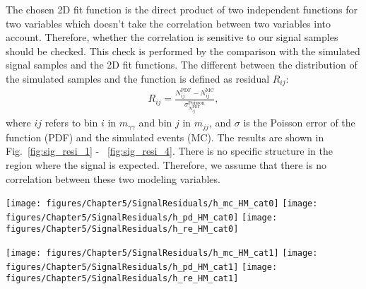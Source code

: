 The chosen 2D fit function is the direct product of two independent functions for two variables which doesn't take the correlation between two variables into account.
Therefore, whether the correlation is sensitive to our signal samples should be checked.
This check is performed by the comparison with the simulated signal samples and the 2D fit functions.
The different between the distribution of the simulated samples and the function is defined as residual $R_{ij}$:
\begin{equation} \label{eq:SigCorResidues}
  \begin{aligned}
	R_{ij} = \frac{N^{\textrm{PDF}}_{ij} - N^{\textrm{MC}}_{ij}}{\sigma_{N^{\textrm{PDF}}_{ij}}^{\textrm{Poisson}}},
  \end{aligned}
\end{equation}
where $ij$ refers to bin $i$ in $m_{\gamma\gamma}$ and bin $j$ in $m_{jj}$, and $\sigma$ is the Poisson error of the function (PDF) and the simulated events (MC).
The results are shown in Fig.~\ref{fig:sig_resi_1} - ~\ref{fig:sig_resi_4}.
There is no specific structure in the region where the signal is expected.
Therefore, we assume that there is no correlation between these two modeling variables.

\begin{figure*}[h]
  \centering
\texttt{[image: figures/Chapter5/SignalResiduals/h\_mc\_HM\_cat0]}\hfil
\texttt{[image: figures/Chapter5/SignalResiduals/h\_pd\_HM\_cat0]}\hfil
\texttt{[image: figures/Chapter5/SignalResiduals/h\_re\_HM\_cat0]}\hfil
  \caption{2D distributions of the signal MC (left), fitted PDF model (center) and 2D residuals (right) for the High Mass-High Purity Category non-resonant selection.}
  \label{fig:sig_resi_1}
\end{figure*}

\begin{figure*}[h]
  \centering
\texttt{[image: figures/Chapter5/SignalResiduals/h\_mc\_HM\_cat1]}\hfil
\texttt{[image: figures/Chapter5/SignalResiduals/h\_pd\_HM\_cat1]}\hfil
\texttt{[image: figures/Chapter5/SignalResiduals/h\_re\_HM\_cat1]}\hfil
  \caption{2D distributions of the signal MC (left), fitted PDF model (center) and 2D residuals (right) for the High Mass-Medium Purity Category non-resonant selection.}
  \label{fig:sig_resi_2}
\end{figure*}

